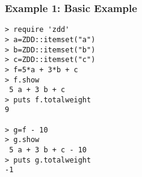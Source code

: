 \subsubsection*{Example 1: Basic Example}



\begin{Verbatim}[baselinestretch=0.7,frame=single]
> require 'zdd'
> a=ZDD::itemset("a")
> b=ZDD::itemset("b")
> c=ZDD::itemset("c")
> f=5*a + 3*b + c
> f.show
 5 a + 3 b + c
> puts f.totalweight
9

> g=f - 10
> g.show
 5 a + 3 b + c - 10
> puts g.totalweight
-1
\end{Verbatim}
